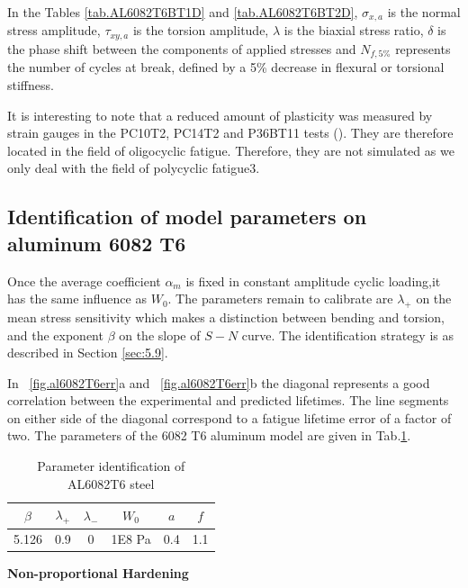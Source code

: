 \documentclass[3p,times,procedia,number]{elsarticle}
\newcommand{\figref}[1]{\figurename~\ref{#1}}
\begin{document}
In the Tables \ref{tab.AL6082T6BT1D} and \ref{tab.AL6082T6BT2D}, $\sigma_{x,a}$ is the normal stress amplitude, $\tau_{xy,a}$ is the torsion amplitude, $\lambda$ is the biaxial stress ratio, $\delta$ is the phase shift between the components of applied stresses and $N_{f,5\%}$ represents the number of cycles at break, defined by a 5\% decrease in flexural or torsional stiffness.

It is interesting to note that a reduced amount of plasticity was measured by strain gauges in the PC10T2, PC14T2 and P36BT11 tests (\cite{susmel2003multiaxial}). They are therefore located in the field of oligocyclic fatigue. Therefore, they are not simulated as we only deal with the field of polycyclic fatigue3.

\newpage
\subsection{Identification of model parameters on aluminum 6082 T6}


Once the average coefficient $\alpha_m$ is fixed in constant amplitude cyclic loading,it has the same influence as $W_0$. The parameters remain to calibrate are $\lambda_{+}$ on the mean stress sensitivity which makes a distinction between bending and torsion, and the exponent $\beta$ on the slope of $S-N$ curve. The identification strategy is as described in Section \ref{sec:5.9}.

In \figref{fig.al6082T6err}a and \figref{fig.al6082T6err}b the diagonal represents a good correlation between the experimental and predicted lifetimes. The line segments on either side of the diagonal correspond to a fatigue lifetime error of a factor of two. The parameters of the 6082 T6 aluminum model are given in Tab.\ref{tab.6082T6para}.

\begin{table}[!h]
	\centering
	\begin{tabular}{|c|c|c|c|c|c|}
		\hline
		\textbf{$\beta$} & \textbf{$\lambda_+$} & \textbf{$\lambda_-$} & \textbf{$W_0$} & \textbf{$a$}  & \textbf{$f$}\\ \hline
		5.126     & 0.9 &0         &1E8 Pa  & 0.4 & 1.1   \\ \hline
	\end{tabular}
	\caption{Parameter identification of AL6082T6 steel}
	\label{tab.6082T6para}
\end{table}

\vspace{6pt}
\textbf{Non-proportional Hardening}
\vspace{6pt}
\end{document}
